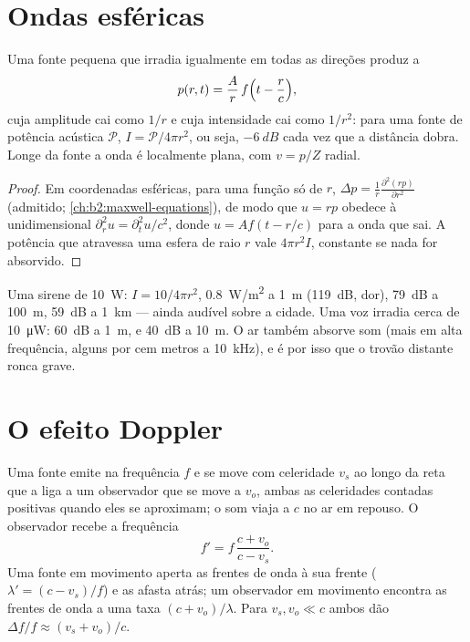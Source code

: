 \section{Ondas esféricas}

\begin{proposition}\label{prop:b2:sound-waves:spherical}
Uma fonte pequena que irradia igualmente em todas as direções produz a
\[
p(r, t) = \frac{A}{r}\,f\Bigl(t - \frac rc\Bigr) ,
\]
cuja amplitude cai como $1/r$ e cuja intensidade cai como $1/r^2$:
para uma fonte de potência acústica $\mathcal P$, $I = \mathcal P/4\pi r^2$, ou seja,
$-\qty{6}{dB}$ cada vez que a distância dobra. Longe da fonte a
onda é localmente plana, com $v = p/Z$ radial.
\end{proposition}

\begin{proof}
Em coordenadas esféricas, para uma função só de $r$, $\Delta p =
\frac1r\frac{\partial^2(rp)}{\partial r^2}$ (admitido; \cref{ch:b2:maxwell-equations}),
de modo que $u = rp$ obedece à  unidimensional $\partial_r^2u = \partial_t^2u/c^2$,
donde $u = Af(t - r/c)$ para a onda que sai. A potência que atravessa uma
esfera de raio $r$ vale $4\pi r^2I$, constante se nada for absorvido.
\end{proof}

\begin{example}\label{ex:b2:sound-waves:siren}
Uma sirene de \qty{10}{W}: $I = 10/4\pi r^2$, \qty{0.8}{W/m^2} a \qty{1}{m} (\qty{119}{dB},
dor), \qty{79}{dB} a \qty{100}{m}, \qty{59}{dB} a \qty{1}{km} --- ainda audível sobre
a cidade. Uma voz irradia cerca de \qty{10}{\micro W}: \qty{60}{dB} a \qty{1}{m},
e \qty{40}{dB} a \qty{10}{m}. O ar também absorve som (mais em alta
frequência, alguns  por cem metros a \qty{10}{kHz}), e é por isso
que o trovão distante ronca grave.
\end{example}

\section{O efeito Doppler}

\begin{theorem}\label{thm:b2:sound-waves:doppler}
Uma fonte emite na frequência $f$ e se move com celeridade $v_s$ ao longo da reta
que a liga a um observador que se move a $v_o$, ambas as celeridades contadas
positivas quando eles se aproximam; o som viaja a $c$ no
ar em repouso. O observador recebe a frequência
\[
f' = f\,\frac{c + v_o}{c - v_s} .
\]
Uma fonte em movimento aperta as frentes de onda à sua frente ($\lambda' = (c - v_s)/f$)
e as afasta atrás; um observador em movimento encontra as frentes de onda a uma
taxa $(c + v_o)/\lambda$. Para $v_s, v_o \ll c$ ambos dão $\Delta f/f \approx
(v_s + v_o)/c$.
\end{theorem}

